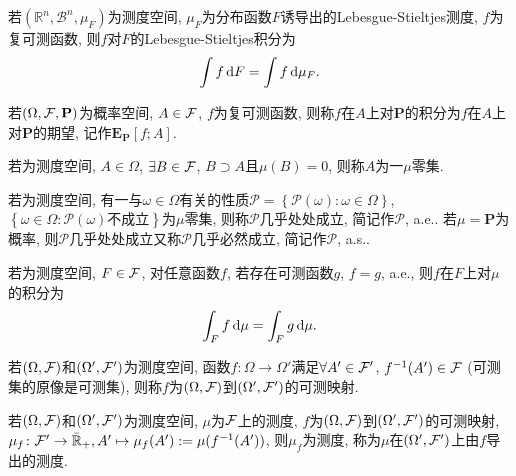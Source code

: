 \begin{definition}
    若$(\mathbb{R}^n,{\mathscr{B}}^n,\mu_F)$为测度空间, $\mu_F$为分布函数$F$诱导出的Lebesgue-Stieltjes测度, $f$为复可测函数, 则$f$对$F$的Lebesgue-Stieltjes积分为
    \begin{equation}
        \int f\,\mathrm{d} F=\int f\,\mathrm{d} \mu_F.
    \end{equation}
\end{definition}

\begin{definition}
    若$(\Omega,\mathcal{F},\mathbf{P})$为概率空间, $A\in\mathcal{F}$, $f$为复可测函数, 则称$f$在$A$上对$\mathbf{P}$的积分为$f$在$A$上对$\mathbf{P}$的期望, 记作$\mathbf{E}_{\mathbf{P}}[f;A]$.
\end{definition}

\begin{definition}
    若\s{}为测度空间, $A\in\Omega$, $\exists  B\in\mathcal{F}$, $B\supset A$且$\mu(B)=0$, 则称$A$为一$\mu$零集.
\end{definition}

\begin{definition}
    若\s{}为测度空间, 有一与$\omega\in\Omega$有关的性质$\mathscr{P}=\left\{\mathscr{P}(\omega)\colon\omega\in\Omega\right\}$, $\left\{\omega\in\Omega\colon\mathscr{P}(\omega)\text{不成立}\right\}$为$\mu$零集, 则称$\mathscr{P}$几乎处处成立, 简记作$\mathscr{P}$, a.e.. 若$\mu=\mathbf{P}$为概率, 则$\mathscr{P}$几乎处处成立又称$\mathscr{P}$几乎必然成立, 简记作$\mathscr{P}$, a.s..
\end{definition}

\begin{definition}
    若\s{}为测度空间, $F\in\mathcal{F}$, 对任意函数$f$, 若存在可测函数$g$, $f=g$, a.e., 则$f$在$F$上对$\mu$的积分为
    \begin{equation}
        \int_{F}f\,\mathrm{d}\mu=\int_{F}g\,\mathrm{d}\mu.
    \end{equation}
\end{definition}

\begin{definition}
    若$(\Omega,\mathcal{F})$和$(\Omega',\mathcal{F}')$为测度空间, 函数$f\colon\Omega\to\Omega'$满足$\forall A' \in \mathcal{F}'$, $f^{-1}(A')\in\mathcal{F}$ (可测集的原像是可测集), 则称$f$为$(\Omega,\mathcal{F})$到$(\Omega',\mathcal{F}')$的可测映射.
\end{definition}

\begin{definition}
    若$(\Omega,\mathcal{F})$和$(\Omega',\mathcal{F}')$为测度空间, $\mu$为$\mathcal{F}$上的测度, $f$为$(\Omega,\mathcal{F})$到$(\Omega',\mathcal{F}')$的可测映射, $\mu_f\colon\mathcal{F}'\to \bar{\mathbb{R}}_+,A'\mapsto\mu_f(A'):=\mu(f^{-1}(A'))$, 则$\mu_f$为测度, 称为$\mu$在$(\Omega',\mathcal{F}')$上由$f$导出的测度.
\end{definition}

